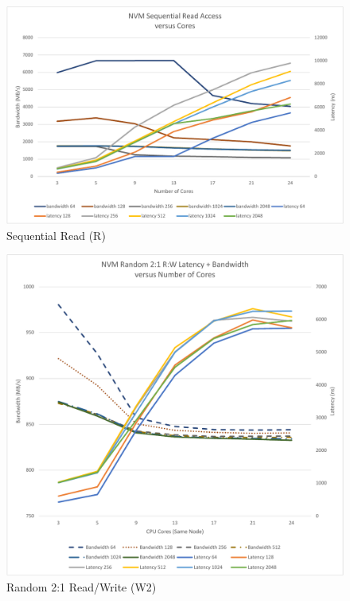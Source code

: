 \begin{figure}
    \centering
    \caption{Sequential Read (R)}\label{chart:sequential:read}
    \includegraphics[width=1.25\textwidth, trim=3cm 0 0 0]{charts/sequential-r-crop.pdf}
\end{figure}

\begin{figure}
    \centering
    \caption{Random 2:1 Read/Write (W2)}\label{chart:random:w2}
    \includegraphics[width=1.25\textwidth,trim=3cm 0 0 0]{charts/random-w2-crop.pdf}
\end{figure}

